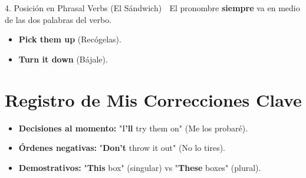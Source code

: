 \documentclass[12pt,a4paper]{article}
\begin{document}
\begin{note}{4. Posición en Phrasal Verbs (El Sándwich) 🥪}
    El pronombre \textbf{siempre} va en medio de las dos palabras del verbo.
    \begin{itemize}[noitemsep]
        \item \textbf{Pick them up} (Recógelas).
        \item \textbf{Turn it down} (Bájale).
    \end{itemize}
\end{note}

\section{Registro de Mis Correcciones Clave}
\begin{itemize}
    \item \textbf{Decisiones al momento:} "I\textbf{'ll} try them on" (Me los probaré).
    \item \textbf{Órdenes negativas:} "\textbf{Don't} throw it out" (No lo tires).
    \item \textbf{Demostrativos:} "\textbf{This} box" (singular) vs "\textbf{These} boxes" (plural).
\end{itemize}
\end{document}

